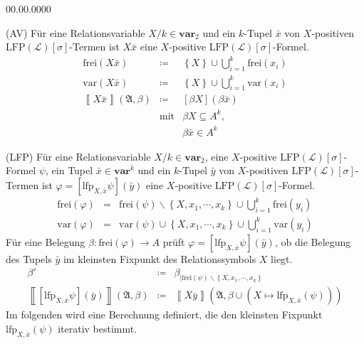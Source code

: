 \begin{labeling}{00.00.0000}
\item [{(AV)}] Für eine Relationsvariable $X/k\in\mathbf{var}_{2}$ und
ein $k$-Tupel $\bar{x}$ von $X$-positiven $\mathrm{LFP}\left(\mathcal{L}\right)\left[\sigma\right]$-Termen
ist $X\bar{x}$ eine $X$-positive $\mathrm{LFP\left(\mathcal{L}\right)}\left[\sigma\right]$-Formel.
\begin{eqnarray*}
\mathrm{frei}\left(X\bar{x}\right) & \coloneqq & \left\{ X\right\} \cup\bigcup_{i=1}^{k}\mathrm{frei}\left(x_{i}\right)\\
\mathrm{var}\left(X\bar{x}\right) & \coloneqq & \left\{ X\right\} \cup\bigcup_{i=1}^{k}\mathrm{var}\left(x_{i}\right)\\
\left\llbracket X\bar{x}\right\rrbracket \left(\mathfrak{A},\beta\right) & \coloneqq & \left[\beta X\right]\left(\beta\bar{x}\right)\\
 & \mathrm{mit} & \beta X\subseteq A^{k},\\
 &  & \beta\bar{x}\in A^{k}
\end{eqnarray*}
\item [{(LFP)}] Für eine Relationsvariable $X/k\in\mathbf{var}_{2}$, eine
$X$-positive $\mathrm{LFP}\left(\mathcal{L}\right)\left[\sigma\right]$-Formel
$\psi$, ein Tupel $\bar{x}\in\mathbf{var}^{k}$ und ein $k$-Tupel
$\bar{y}$ von $X$-positiven $\mathrm{\mathrm{LFP}\left(\mathcal{L}\right)}\left[\sigma\right]$-Termen
ist $\varphi=\left[\mathrm{lfp}_{X,\bar{x}}\psi\right]\left(\bar{y}\right)$
eine $X$-positive $\mathrm{LFP}\left(\mathrm{\mathcal{L}}\right)\left[\sigma\right]$-Formel.
\begin{eqnarray*}
\mathrm{frei}\left(\varphi\right) & = & \mathrm{frei}\left(\psi\right)\backslash\left\{ X,x_{1},\cdots,x_{k}\right\} \cup\bigcup_{i=1}^{k}\mathrm{frei}\left(y_{i}\right)\\
\mathrm{var}\left(\varphi\right) & = & \mathrm{var}\left(\psi\right)\cup\left\{ X,x_{1},\cdots,x_{k}\right\} \cup\bigcup_{i=1}^{k}\mathrm{var}\left(y_{i}\right)
\end{eqnarray*}
Für eine Belegung $\beta:\mathrm{frei}\left(\varphi\right)\rightarrow A$
prüft $\varphi=\left[\mathrm{lfp}_{X,\bar{x}}\psi\right]\left(\bar{y}\right)$,
ob die Belegung des Tupels $\bar{y}$ im kleinsten Fixpunkt des Relationssymbols
$X$ liegt. 
\begin{eqnarray*}
\beta' & \coloneqq & \beta_{\mid\mathrm{frei}\left(\psi\right)\backslash\left\{ X,x_{1},\cdots,x_{k}\right\} }\\
\left\llbracket \left[\mathrm{lfp}_{X,\bar{x}}\psi\right]\left(\bar{y}\right)\right\rrbracket \left(\mathfrak{A},\beta\right) & \coloneqq & \left\llbracket X\bar{y}\right\rrbracket \left(\mathfrak{A},\beta\cup\left(X\mapsto\mathrm{lfp}_{X,\bar{x}}\left(\psi\right)\right)\right)
\end{eqnarray*}
Im folgenden wird eine Berechnung definiert, die den kleinsten Fixpunkt
$\mathrm{lfp}_{X,\bar{x}}\left(\psi\right)$ iterativ bestimmt.
\end{labeling}
